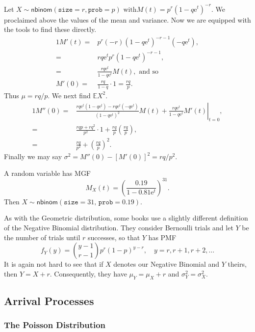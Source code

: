 Let \(X\sim\mathsf{nbinom}(\mathtt{size}=r,\mathtt{prob}=p)\mbox{ with
$M(t)=p^{r}(1-q\mathrm{e}^{t})^{-r}$}\). We proclaimed above the
values of the mean and variance. Now we are equipped with the tools to
find these directly.
\begin{alignat*}{1}
M'(t)= & p^{r}(-r)(1-q\mathrm{e}^{t})^{-r-1}(-q\mathrm{e}^{t}),\\
= & rq\mathrm{e}^{t}p^{r}(1-q\mathrm{e}^{t})^{-r-1},\\
= & \frac{rq\mathrm{e}^{t}}{1-q\mathrm{e}^{t}}M(t),\mbox{ and so }\\
M'(0)= & \frac{rq}{1-q}\cdot1=\frac{rq}{p}.
\end{alignat*}
Thus \(\mu=rq/p\). We next find \(\mathbb{E} X^{2}\).
\begin{alignat*}{1}
M''(0)= & \left.\frac{rq\mathrm{e}^{t}(1-q\mathrm{e}^{t})-rq\mathrm{e}^{t}(-q\mathrm{e}^{t})}{(1-q\mathrm{e}^{t})^{2}}M(t)+\frac{rq\mathrm{e}^{t}}{1-q\mathrm{e}^{t}}M'(t)\right|_{t=0},\\
= & \frac{rqp+rq^{2}}{p^{2}}\cdot1+\frac{rq}{p}\left(\frac{rq}{p}\right),\\
= & \frac{rq}{p^{2}}+\left(\frac{rq}{p}\right)^{2}.
\end{alignat*}
Finally we may say \( \sigma^{2} = M''(0) - [M'(0)]^{2} = rq/p^{2}. \)


A random variable has MGF
\[
M_{X}(t)=\left(\frac{0.19}{1-0.81\mathrm{e}^{t}}\right)^{31}.
\]
Then \(X\sim\mathsf{nbinom}(\mathtt{size}=31,\,\mathtt{prob}=0.19)\).


\begin{note}
As with the Geometric distribution, some books use a slightly
different definition of the Negative Binomial distribution. They
consider Bernoulli trials and let \(Y\) be the number of trials until
\(r\) successes, so that \(Y\) has PMF
\begin{equation}
f_{Y}(y)={y-1 \choose r-1}p^{r}(1-p)^{y-r},\quad y=r,r+1,r+2,\ldots
\end{equation}
It is again not hard to see that if \(X\) denotes our Negative
Binomial and \(Y\) theirs, then \(Y=X+r\). Consequently, they have
\(\mu_{Y}=\mu_{X}+r\) and \(\sigma_{Y}^{2}=\sigma_{X}^{2}\).
\end{note}

\subsection{Arrival Processes}
\label{sec-5-6-3}

\subsubsection{The Poisson Distribution}
\label{sec-5-6-3-1}

